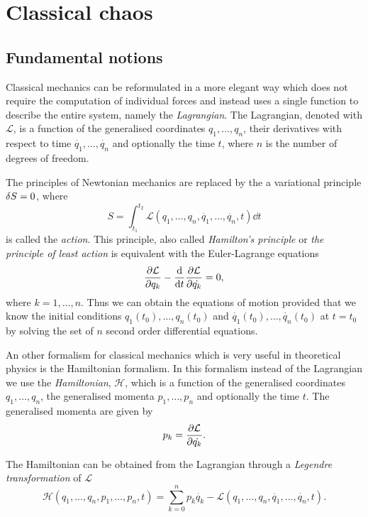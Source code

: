 \documentclass[../thesis.tex]{subfiles}
\theoremstyle{plain}
\begin{document}
\chapter{Classical chaos}
\label{chap:classical-chaos}

\section{Fundamental notions}

Classical mechanics can be reformulated in a more elegant way which does not
require the computation of individual forces and instead uses a single function to
describe the entire system, namely the \emph{Lagrangian}.
The Lagrangian, denoted with \(\mathcal{L}\), is a function of the generalised
coordinates \(q_1, \dotsc, q_n\), their derivatives with respect to time
\(\dot{q_1}, \dotsc, \dot{q_n}\) and optionally the time \(t\), where \(n\)
is the number of degrees of freedom.

The principles of Newtonian mechanics are replaced by the a variational principle
\(\var{S} = 0\), where
\begin{equation}
  \label{eq:action}
  S = \int_{t_1}^{t_2} \mathcal{L}(q_1, \dotsc, q_n, \dot{q_1}, \dotsc, \dot{q_n},t) \dd{t}
\end{equation}
is called the \emph{action}.
This principle, also called \emph{Hamilton's principle} or \emph{the principle of least action}
is equivalent with the Euler-Lagrange equations
\[
  \pdv{\mathcal{L}}{q_k} - \dv{t}\pdv{\mathcal{L}}{\dot{q_k}} = 0,
\]
where \(k=1,\dotsc, n\).
Thus we can obtain the equations of motion provided that we know the initial
conditions \(q_1(t_0), \dotsc, q_n(t_0)\) and \(\dot{q_1}(t_0), \dotsc, \dot{q_n}(t_0)\)
at \(t=t_0\) by solving the set of \(n\) second order differential equations.

An other formalism for classical mechanics which is very useful in theoretical physics is
the Hamiltonian formalism. In this formalism instead of the \mbox{Lagrangian} we use the
\emph{Hamiltonian}, \(\mathcal{H}\), which is a function of the generalised coordinates
\(q_1, \dotsc, q_n\), the generalised momenta \(p_1, \dotsc, p_n\) and optionally
the time \(t\). The generalised momenta are given by
\[
  p_k = \pdv{\mathcal{L}}{\dot{q_k}}.
\]

The Hamiltonian can be obtained from the Lagrangian through a \emph{Legendre transformation} of
\(\mathcal{L}\)
\begin{equation}
  \label{eq:legendre-tr}
  \mathcal{H}(q_1, \dotsc, q_n, p_1, \dotsc, p_n, t)
  = \sum_{k=0}^n p_k\dot{q_k} - \mathcal{L}(q_1, \dotsc, q_n, \dot{q_1}, \dotsc, \dot{q_n}, t).
\end{equation}
\end{document}
